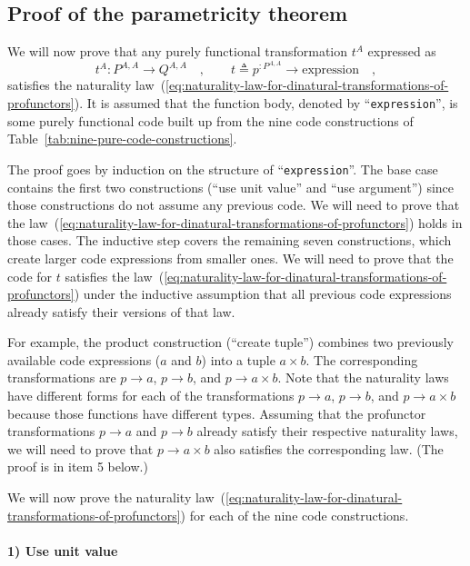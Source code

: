 \subsection{Proof of the parametricity theorem}

We will now prove that any purely functional transformation $t^{A}$
expressed as 
\[
t^{A}:P^{A,A}\rightarrow Q^{A,A}\quad,\quad\quad t\triangleq p^{:P^{A,A}}\rightarrow\text{expression}\quad,
\]
satisfies the naturality law~(\ref{eq:naturality-law-for-dinatural-transformations-of-profunctors}).
It is assumed that the function body, denoted by ``\lstinline!expression!'',
is some purely functional code built up from the nine code constructions
of Table~\ref{tab:nine-pure-code-constructions}.

The proof goes by induction on the structure of ``\lstinline!expression!''.
The base case contains the first two constructions (``use unit value''
and ``use argument'') since those constructions do not assume any
previous code. We will need to prove that the law~(\ref{eq:naturality-law-for-dinatural-transformations-of-profunctors})
holds in those cases. The inductive step covers the remaining seven
constructions, which create larger code expressions from smaller ones.
We will need to prove that the code for $t$ satisfies the law~(\ref{eq:naturality-law-for-dinatural-transformations-of-profunctors})
under the inductive assumption that all previous code expressions
already satisfy their versions of that law.

For example, the product construction (``create tuple'') combines
two previously available code expressions ($a$ and $b$) into a tuple
$a\times b$. The corresponding transformations are $p\rightarrow a$,
$p\rightarrow b$, and $p\rightarrow a\times b$. Note that the naturality
laws have different forms for each of the transformations $p\rightarrow a$,
$p\rightarrow b$, and $p\rightarrow a\times b$ because those functions
have different types. Assuming that the profunctor transformations
$p\rightarrow a$ and $p\rightarrow b$ already satisfy their respective
naturality laws, we will need to prove that $p\rightarrow a\times b$
also satisfies the corresponding law. (The proof is in item 5 below.)

We will now prove the naturality law~(\ref{eq:naturality-law-for-dinatural-transformations-of-profunctors})
for each of the nine code constructions.

\paragraph{1) Use unit value}

